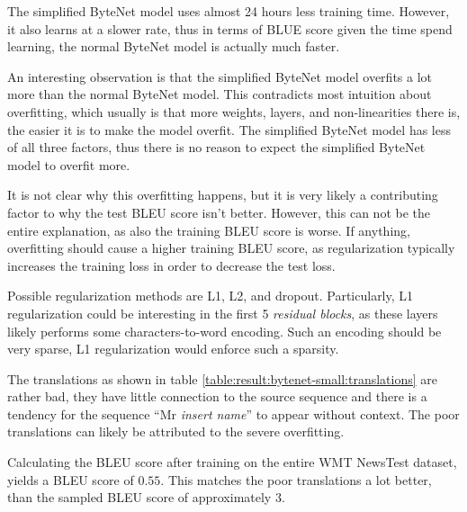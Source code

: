 The simplified ByteNet model uses almost 24 hours less training time. However, it also learns at a slower rate, thus in terms of BLUE score given the time spend learning, the normal ByteNet model is actually much faster.

An interesting observation is that the simplified ByteNet model overfits a lot more than the normal ByteNet model. This contradicts most intuition about overfitting, which usually is that more weights, layers, and non-linearities there is, the easier it is to make the model overfit. The simplified ByteNet model has less of all three factors, thus there is no reason to expect the simplified ByteNet model to overfit more.

It is not clear why this overfitting happens, but it is very likely a contributing factor to why the test BLEU score isn't better. However, this can not be the entire explanation, as also the training BLEU score is worse. If anything, overfitting should cause a higher training BLEU score, as regularization typically increases the training loss in order to decrease the test loss.

Possible regularization methods are L1, L2, and dropout. Particularly, L1 regularization could be interesting in the first 5 \textit{residual blocks}, as these layers likely performs some characters-to-word encoding. Such an encoding should be very sparse, L1 regularization would enforce such a sparsity.

The translations as shown in table \ref{table:result:bytenet-small:translations} are rather bad, they have little connection to the source sequence and there is a tendency for the sequence ``Mr \textit{insert name}'' to appear without context. The poor translations can likely be attributed to the severe overfitting.

Calculating the BLEU score after training on the entire WMT NewsTest dataset, yields a BLEU score of $0.55$. This matches the poor translations a lot better, than the sampled BLEU score of approximately $3$.

